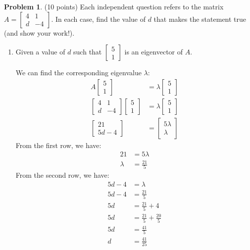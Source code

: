 \documentclass[11pt]{article}
\theoremstyle{definition}
\newtheorem{problem}{Problem}
\begin{document}
\begin{problem}
(10 points) Each independent question refers to the matrix $A = \begin{bmatrix}
    4 & 1 \\
    d & -4 
\end{bmatrix}$. In each case, find the value of $d$ that makes the statement true (and show your work!).
\begin{enumerate}[label=(\alph*)]
    \item Given a value of $d$ such that $\begin{bmatrix}
        5 \\ 1
    \end{bmatrix}$ is an eigenvector of $A$. 

    We can find the corresponding eigenvalue $\lambda$:
    \begin{align}
        A\begin{bmatrix}
            5 \\ 1
        \end{bmatrix} &= \lambda \begin{bmatrix}
            5 \\ 1
        \end{bmatrix} \\
        \begin{bmatrix}
            4 & 1 \\
            d & -4 
        \end{bmatrix} \begin{bmatrix}
            5 \\ 1
        \end{bmatrix} &= \lambda \begin{bmatrix}
            5 \\ 1
        \end{bmatrix} \\
        \begin{bmatrix}
            21 \\ 5d - 4
        \end{bmatrix} &= \begin{bmatrix}
            5\lambda \\ \lambda
        \end{bmatrix}
    \end{align}
    From the first row, we have:
    \begin{align}
        21 &= 5\lambda \\
        \lambda &= \frac{21}{5}
    \end{align}
    From the second row, we have:
    \begin{align}
        5d - 4 &= \lambda \\
        5d - 4 &= \frac{21}{5} \\
        5d &= \frac{21}{5} + 4 \\
        5d &= \frac{21}{5} + \frac{20}{5} \\
        5d &= \frac{41}{5} \\
        d &= \frac{41}{25}
    \end{align}


\end{enumerate}
\end{problem}
\end{document}
